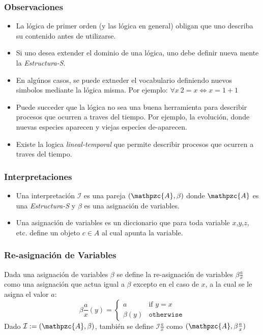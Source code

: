 \documentclass{beamer}
\begin{document}
\begin{frame}
    \frametitle{Observaciones}
    \begin{itemize}
        \item{La l\'ogica de primer orden (y las l\'ogica en general) obligan
            que uno describa su contenido antes de utilizarse.}
        \item{Si uno desea extender el dominio de una l\'ogica, uno debe definir
            nueva mente la \emph{Estructura-S}.}
        \item{En alg\'unos casos, se puede extneder el vocabulario definiendo nuevos
            simbolos mediante la l\'ogica misma. Por ejemplo: $\forall x\ 2=x\Leftrightarrow x=1+1$}
        \item{Puede succeder que la l\'ogica no sea una buena herramienta para describir
            procesos que ocurren a traves del tiempo. Por ejemplo, la evoluci\'on, donde
            nuevas especies aparecen y viejas especies de-aparecen.}
        \item{Existe la logica \emph{lineal-temporal} que permite describir procesos
            que ocurren a traves del tiempo.}
    \end{itemize}
\end{frame}

\begin{frame}
    \frametitle{Interpretaciones}
    \begin{itemize}
        \item{ Una interpretaci\'on $\mathcal{I}$ es una pareja $(\mathpzc{A}, \beta)$ donde
            $\mathpzc{A}$ es una \emph{Estructura-S} y $\beta$ es una asignaci\'on de variables.}
        \item{Una asignaci\'on de variables es un diccionario que para toda variable $x$,$y$,$z$, etc.
            define un objeto $c\in A$ al cual apunta la variable.}
    \end{itemize}
\end{frame}

\begin{frame}
    \frametitle{Re-asignaci\'on de Variables}
    Dada una asignaci\'on de variables $\beta$ se define la re-asignaci\'on
    de variables $\beta \frac{a}{x}$ como una asignaci\'on que actua igual a
    $\beta$ excepto en el caso de $x$, a la cual se le asigna el valor $a$:
    \[
        \beta \frac{a}{x}(y)=
        \left\{
            \begin{array}{ll}
                a  & \mbox{if } y = x \\
                \beta(y) & \mathtt{otherwise}
            \end{array}
        \right.
    \]
    Dado $\mathcal{I}:=(\mathpzc{A},\beta)$, tambi\'en se define $\mathcal{I}\frac{a}{x}$
    como $(\mathpzc{A}, \beta\frac{a}{x})$
\end{frame}
\end{document}
